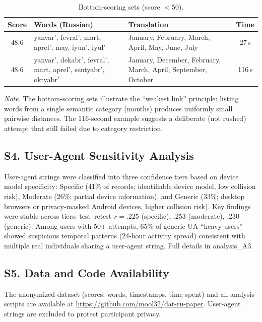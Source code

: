 \documentclass[12pt]{article}
\begin{document}
\begin{table}[htbp]
\centering
\caption{Bottom-scoring sets (score $< 50$).}
\label{tab:examples_bottom}
\small
\begin{tabular}{@{}clp{7cm}c@{}}
\toprule
Score & Words (Russian) & Translation & Time \\
\midrule
48.6 & \parbox[t]{4cm}{\raggedright yanvar', fevral', mart, aprel', may, iyun', iyul'} & January, February, March, April, May, June, July & 27\,s \\
48.6 & \parbox[t]{4cm}{\raggedright yanvar', dekabr', fevral', mart, aprel', sentyabr', oktyabr'} & January, December, February, March, April, September, October & 116\,s \\
\bottomrule
\end{tabular}

\smallskip
\noindent\textit{Note.} The bottom-scoring sets illustrate the ``weakest link'' principle: listing words from a single semantic category (months) produces uniformly small pairwise distances. The 116-second example suggests a deliberate (not rushed) attempt that still failed due to category restriction.
\end{table}

\subsection{S4. User-Agent Sensitivity Analysis}

User-agent strings were classified into three confidence tiers based on device model specificity: Specific (41\% of records; identifiable device model, low collision risk), Moderate (26\%; partial device information), and Generic (33\%; desktop browsers or privacy-masked Android devices, higher collision risk). Key findings were stable across tiers: test--retest $r = .225$ (specific), .253 (moderate), .230 (generic). Among users with 50+ attempts, 65\% of generic-UA ``heavy users'' showed suspicious temporal patterns (24-hour activity spread) consistent with multiple real individuals sharing a user-agent string. Full details in analysis\_A3.

\subsection{S5. Data and Code Availability}

The anonymized dataset (scores, words, timestamps, time spent) and all analysis scripts are available at \url{https://github.com/mool32/dat-ru-paper}. User-agent strings are excluded to protect participant privacy.
\end{document}
